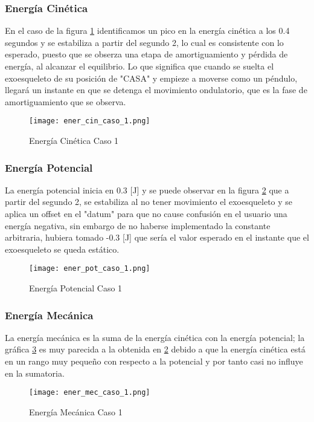     \subsubsection{Energía Cinética}

    En el caso de la figura \ref{fig:eCinC1} identificamos un pico en la energía cinética a los 0.4 segundos y se estabiliza a partir del segundo 2, lo cual es consistente con lo esperado, puesto que se obserza una etapa de amortiguamiento y pérdida de energía, al alcanzar el equilibrio. Lo que significa que cuando se suelta el exoesqueleto de su posición de "CASA" y empieze a moverse como un péndulo, llegará un instante en que se detenga el movimiento ondulatorio, que es la fase de amortiguamiento que se observa.
    \begin{figure}[H]%
            \centering
            \texttt{[image: ener\_cin\_caso\_1.png]} 
        \caption{Energía Cinética Caso 1}
        \label{fig:eCinC1}
    \end{figure}

    \subsubsection{Energía Potencial}
    La energía potencial inicia en 0.3 [J] y se puede observar en la figura \ref{fig:ePotC1} que a partir del segundo 2, se estabiliza al no tener movimiento el exoesqueleto y se aplica un offset en el "datum" para que no cause confusión en el usuario una energía negativa, sin embargo de no haberse implementado la constante arbitraria, hubiera tomado -0.3 [J] que sería el valor esperado en el instante que el exoesqueleto se queda estático.
    \begin{figure} [H]%
            \centering
            \texttt{[image: ener\_pot\_caso\_1.png]} 
        \caption{Energía Potencial Caso 1}
        \label{fig:ePotC1}
    \end{figure}

    \subsubsection{Energía Mecánica}
    La energía mecánica es la suma de la energía cinética con la energía potencial; la gráfica \ref{fig:eMecC1} es muy parecida a la obtenida en \ref{fig:ePotC1} debido a que la energía cinética está en un rango muy pequeño con respecto a la potencial y por tanto casi no influye en la sumatoria. 

    \begin{figure} [H]%
            \centering
            \texttt{[image: ener\_mec\_caso\_1.png]} 
        \caption{Energía Mecánica Caso 1}
        \label{fig:eMecC1}
    \end{figure}

